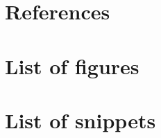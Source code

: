 \documentclass[a4paper]{article}
\begin{document}
\section{References}

\newpage
\section{List of figures}
\listoffigures
\newpage
\section{List of snippets}
\listoflistings
\end{document}
